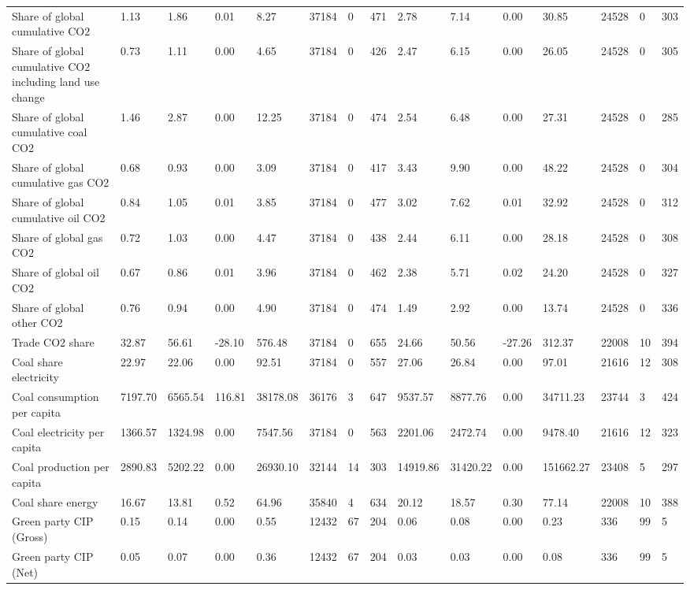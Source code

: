 \begin{longtable}{lllllllllllllll}
Share of global cumulative CO2 & 1.13 & 1.86 & 0.01 & 8.27 & 37184 & 0 & 471 & 2.78 & 7.14 & 0.00 & 30.85 & 24528 & 0 & 303\\
Share of global cumulative CO2 including land use change & 0.73 & 1.11 & 0.00 & 4.65 & 37184 & 0 & 426 & 2.47 & 6.15 & 0.00 & 26.05 & 24528 & 0 & 305\\
Share of global cumulative coal CO2 & 1.46 & 2.87 & 0.00 & 12.25 & 37184 & 0 & 474 & 2.54 & 6.48 & 0.00 & 27.31 & 24528 & 0 & 285\\
Share of global cumulative gas CO2 & 0.68 & 0.93 & 0.00 & 3.09 & 37184 & 0 & 417 & 3.43 & 9.90 & 0.00 & 48.22 & 24528 & 0 & 304\\
\addlinespace
Share of global cumulative oil CO2 & 0.84 & 1.05 & 0.01 & 3.85 & 37184 & 0 & 477 & 3.02 & 7.62 & 0.01 & 32.92 & 24528 & 0 & 312\\
Share of global gas CO2 & 0.72 & 1.03 & 0.00 & 4.47 & 37184 & 0 & 438 & 2.44 & 6.11 & 0.00 & 28.18 & 24528 & 0 & 308\\
Share of global oil CO2 & 0.67 & 0.86 & 0.01 & 3.96 & 37184 & 0 & 462 & 2.38 & 5.71 & 0.02 & 24.20 & 24528 & 0 & 327\\
Share of global other CO2 & 0.76 & 0.94 & 0.00 & 4.90 & 37184 & 0 & 474 & 1.49 & 2.92 & 0.00 & 13.74 & 24528 & 0 & 336\\
Trade CO2 share & 32.87 & 56.61 & -28.10 & 576.48 & 37184 & 0 & 655 & 24.66 & 50.56 & -27.26 & 312.37 & 22008 & 10 & 394\\
\addlinespace
Coal share electricity & 22.97 & 22.06 & 0.00 & 92.51 & 37184 & 0 & 557 & 27.06 & 26.84 & 0.00 & 97.01 & 21616 & 12 & 308\\
Coal consumption per capita & 7197.70 & 6565.54 & 116.81 & 38178.08 & 36176 & 3 & 647 & 9537.57 & 8877.76 & 0.00 & 34711.23 & 23744 & 3 & 424\\
Coal electricity per capita & 1366.57 & 1324.98 & 0.00 & 7547.56 & 37184 & 0 & 563 & 2201.06 & 2472.74 & 0.00 & 9478.40 & 21616 & 12 & 323\\
Coal production per capita & 2890.83 & 5202.22 & 0.00 & 26930.10 & 32144 & 14 & 303 & 14919.86 & 31420.22 & 0.00 & 151662.27 & 23408 & 5 & 297\\
Coal share energy & 16.67 & 13.81 & 0.52 & 64.96 & 35840 & 4 & 634 & 20.12 & 18.57 & 0.30 & 77.14 & 22008 & 10 & 388\\
\addlinespace
Green party CIP (Gross) & 0.15 & 0.14 & 0.00 & 0.55 & 12432 & 67 & 204 & 0.06 & 0.08 & 0.00 & 0.23 & 336 & 99 & 5\\
Green party CIP (Net) & 0.05 & 0.07 & 0.00 & 0.36 & 12432 & 67 & 204 & 0.03 & 0.03 & 0.00 & 0.08 & 336 & 99 & 5\\

\end{longtable}

